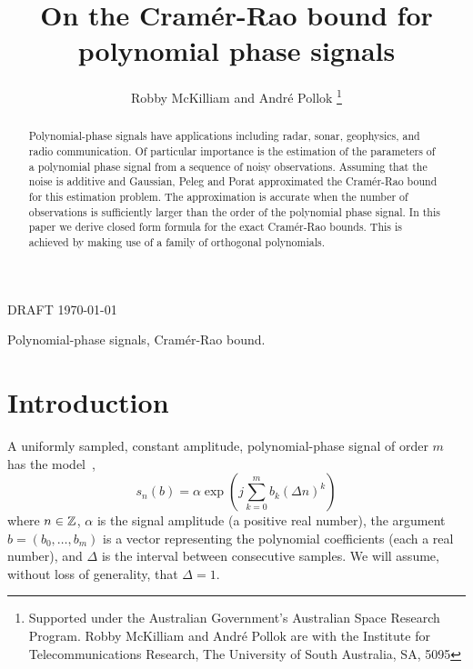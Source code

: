 \documentclass[journal,10pt]{IEEEtran}
\begin{document}
\title{On the Cram\'{e}r-Rao bound for polynomial phase signals}

\author{Robby McKilliam and Andr\'{e} Pollok%
\thanks{Supported under the Australian Government's Australian Space Research Program.
Robby McKilliam and Andr\'{e} Pollok are with the Institute for Telecommunications Research, The University of South Australia, SA, 5095}
}
%
{DRAFT \today}



\maketitle


\begin{abstract}
Polynomial-phase signals have applications including radar, sonar, geophysics, and radio communication.  Of particular importance is the estimation of the parameters of a polynomial phase signal from a sequence of noisy observations.  Assuming that the noise is additive and Gaussian,  Peleg and Porat approximated the Cram\'{e}r-Rao bound for this estimation problem.  The approximation is accurate when the number of observations is sufficiently larger than the order of the polynomial phase signal.  In this paper we derive closed form formula for the exact Cram\'{e}r-Rao bounds.  This is achieved by making use of a family of orthogonal polynomials.
\end{abstract}

\begin{IEEEkeywords}
Polynomial-phase signals, Cram\'{e}r-Rao bound.
\end{IEEEkeywords}



\section{Introduction}

A uniformly sampled, constant amplitude, polynomial-phase signal of order $m$ has the model~\cite{Peleg_DPT_1995, Peleg1991_CRB_PPS_1991, Peleg1991_est_class_PPS_1991, Rihaczek1996},
\[
s_n(b) = \alpha \exp\left( j \sum_{k = 0}^{m}{b_k (\Delta n)^k}\right)
\]
where $n \in {\mathbb Z}$, $\alpha$ is the signal amplitude (a positive real number), the argument $b=(b_0, \dots, b_m)$ is a vector representing the polynomial coefficients (each a real number),  and $\Delta$ is the interval between consecutive samples.  We will assume, without loss of generality, that $\Delta = 1$.
\end{document}
